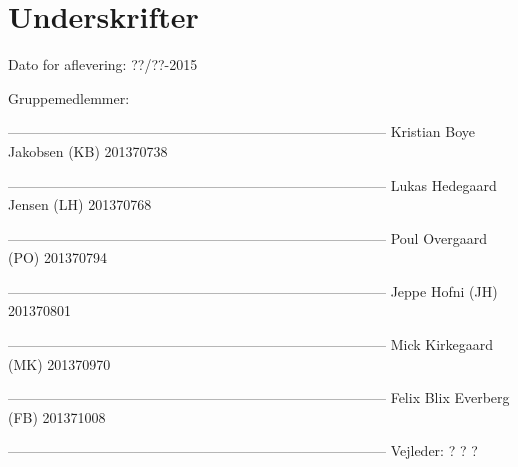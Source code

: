 \chapter*{Underskrifter}

Dato for aflevering: ??/??-2015

Gruppemedlemmer: \newline


--------------------------------------------------------------------------------- \newline
Kristian Boye Jakobsen (KB) 201370738\newline


--------------------------------------------------------------------------------- \newline
Lukas Hedegaard Jensen (LH) 201370768\newline


--------------------------------------------------------------------------------- \newline
Poul Overgaard (PO) 201370794\newline


--------------------------------------------------------------------------------- \newline
Jeppe Hofni (JH) 201370801\newline


--------------------------------------------------------------------------------- \newline
Mick Kirkegaard (MK) 201370970\newline


--------------------------------------------------------------------------------- \newline
Felix Blix Everberg (FB) 201371008\newline













--------------------------------------------------------------------------------- \newline
Vejleder: ? ? ?\newline

\afterpage{\null\newpage}
